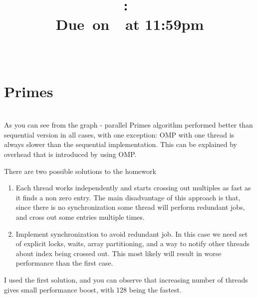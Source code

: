 \documentclass{article}
\title{
    \vspace{2in}
    \textmd{\textbf{\hmwkClass:\ \hmwkTitle}}\\
        \normalsize\vspace{0.1in}\small{Due\ on\ \hmwkDueDate\ at 11:59pm}\\
        \vspace{0.1in}\large{\textit{\hmwkClassInstructor\ \hmwkClassTime}}
    \vspace{3in}
}
\author{\textbf{\hmwkAuthorName}}
\date{}
\begin{document}
\maketitle

\pagebreak

\section{\textbf{Primes}} \\
As you can see from the graph - parallel Primes algorithm performed better than sequential
version in all cases, with
one exception: OMP with one thread is always slower than the sequential implementation. 
This can be explained by overhead that is introduced by using OMP.

There are two possible solutions to the homework
\begin{enumerate}[1.]
\item Each thread works independently and starts crossing out multiples as fast as it finds a
non zero entry. The main disadvantage of this approach is that, since there is no
synchronization some thread will perform redundant jobs, and cross out some entries multiple
times.
\item Implement synchronization to avoid redundant job. In this case we need set of explicit
locks, waits, array partitioning, and a way to notify other threads about index being crossed out.
This most likely will result in worse performance than the first case.
\end{enumerate}

I used the first solution, and you can observe that increasing number of threads gives small
performance boost, with 128 being the fastest.\\
\end{document}
